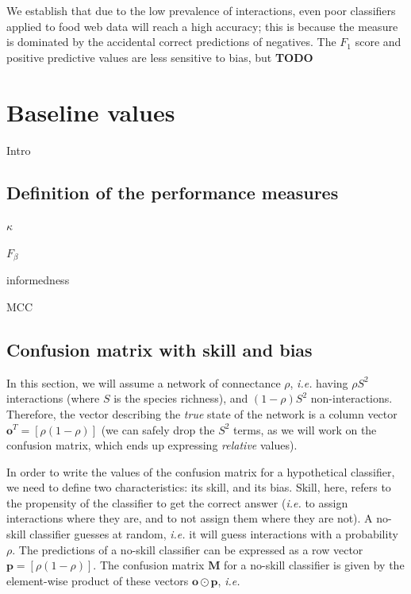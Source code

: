 \documentclass[10pt,oneside]{article}
\begin{document}
We establish that due to the low prevalence of interactions, even poor
classifiers applied to food web data will reach a high accuracy; this is
because the measure is dominated by the accidental correct predictions
of negatives. The \(F_1\) score and positive predictive values are less
sensitive to bias, but \textbf{TODO}

\hypertarget{baseline-values}{%
\section{Baseline values}\label{baseline-values}}

Intro

\hypertarget{definition-of-the-performance-measures}{%
\subsection{Definition of the performance
measures}\label{definition-of-the-performance-measures}}

\(\kappa\)

\(F_{\beta}\)

informedness

MCC

\hypertarget{confusion-matrix-with-skill-and-bias}{%
\subsection{Confusion matrix with skill and
bias}\label{confusion-matrix-with-skill-and-bias}}

In this section, we will assume a network of connectance \(\rho\),
\emph{i.e.} having \(\rho S^2\) interactions (where \(S\) is the species
richness), and \((1-\rho) S^2\) non-interactions. Therefore, the vector
describing the \emph{true} state of the network is a column vector
\(\mathbf{o}^T = [\rho (1-\rho)]\) (we can safely drop the \(S^2\)
terms, as we will work on the confusion matrix, which ends up expressing
\emph{relative} values).

In order to write the values of the confusion matrix for a hypothetical
classifier, we need to define two characteristics: its skill, and its
bias. Skill, here, refers to the propensity of the classifier to get the
correct answer (\emph{i.e.} to assign interactions where they are, and
to not assign them where they are not). A no-skill classifier guesses at
random, \emph{i.e.} it will guess interactions with a probability
\(\rho\). The predictions of a no-skill classifier can be expressed as a
row vector \(\mathbf{p} = [\rho (1-\rho)]\). The confusion matrix
\(\mathbf{M}\) for a no-skill classifier is given by the element-wise
product of these vectors \(\mathbf{o} \odot \mathbf{p}\), \emph{i.e.}
\end{document}
